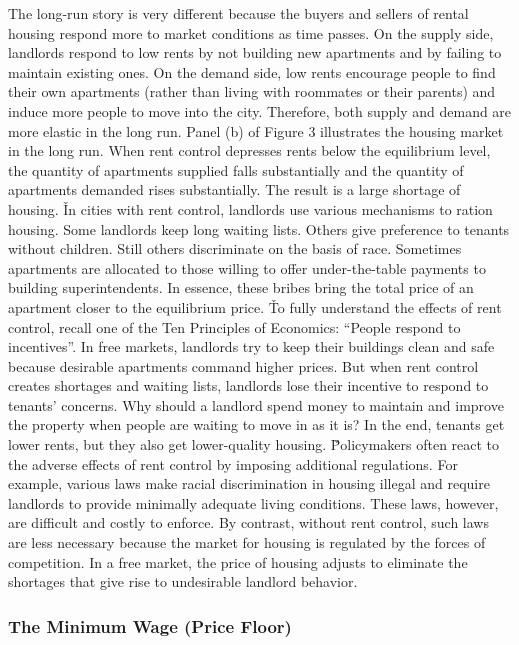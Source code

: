 
The long-run story is very different because the buyers and sellers of rental housing respond more to market
conditions as time passes. On the supply side, landlords respond to low rents by not building new apartments and by
failing to maintain existing ones. On the demand side, low rents encourage people to find their own apartments
(rather than living with roommates or their parents) and induce more people to move into the city. Therefore, both
supply and demand are more elastic in the long run. Panel (b) of Figure 3 illustrates the housing market in the long
run. When rent control depresses rents below the equilibrium level, the quantity of apartments supplied falls
substantially and the quantity of apartments demanded rises substantially. The result is a large shortage of housing. \v

In cities with rent control, landlords use various mechanisms to ration housing. Some landlords keep long waiting
lists. Others give preference to tenants without children. Still others discriminate on the basis of race. Sometimes
apartments are allocated to those willing to offer under-the-table payments to building superintendents. In essence,
these bribes bring the total price of an apartment closer to the equilibrium price. \v

To fully understand the effects of rent control, recall one of the Ten Principles of Economics: ``People respond to
incentives''. In free markets, landlords try to keep their buildings clean and safe because desirable apartments
command higher prices. But when rent control creates shortages and waiting lists, landlords lose their incentive to
respond to tenants' concerns. Why should a landlord spend money to maintain and improve the property when people are
waiting to move in as it is? In the end, tenants get lower rents, but they also get lower-quality housing. \v

Policymakers often react to the adverse effects of rent control by imposing additional regulations. For example,
various laws make racial discrimination in housing illegal and require landlords to provide minimally adequate living
conditions. These laws, however, are difficult and costly to enforce. By contrast, without rent control, such laws
are less necessary because the market for housing is regulated by the forces of competition. In a free market, the
price of housing adjusts to eliminate the shortages that give rise to undesirable landlord behavior.

\subsubsection*{The Minimum Wage (Price Floor)}

